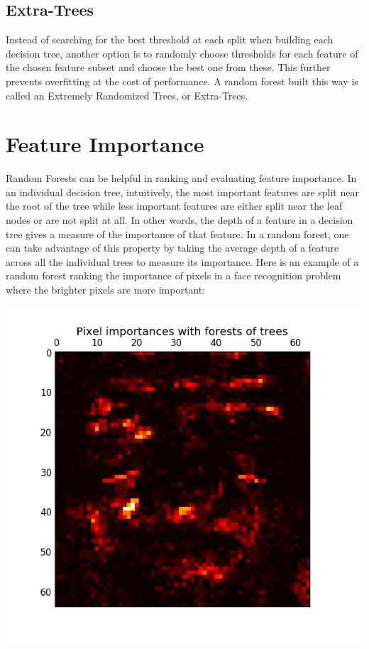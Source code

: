 \documentclass{article}
\begin{document}
\subsection{Extra-Trees}
Instead of searching for the best threshold at each split when building each decision tree, another option is to randomly choose thresholds for each feature of the chosen feature subset and choose the best one from these. This further prevents overfitting at the cost of performance. A random forest built this way is called an Extremely Randomized Trees, or Extra-Trees.

\section{Feature Importance}
Random Forests can be helpful in ranking and evaluating feature importance. In an individual decision tree, intuitively, the most important features are split near the root of the tree while less important features are either split near the leaf nodes or are not split at all. In other words, the depth of a feature in a decision tree gives a measure of the importance of that feature. In a random forest, one can take advantage of this property by taking the average depth of a feature across all the individual trees to measure its importance. 
Here is an example of a random forest ranking the importance of pixels in a face recognition problem where the brighter pixels are more important:

\begin{center}
    \includegraphics[scale=.4]{featureimportance.jpg}
\end{center}
\end{document}

